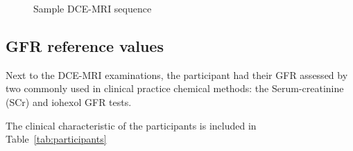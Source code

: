 \begin{figure}[H]
			\hspace{0.005\linewidth}
		\hspace{0.005\linewidth}
	\hspace{0.005\linewidth}
\vspace{0.5cm}
\caption[Sample DCE-MRI sequence.]{Sample DCE-MRI sequence}
\label{fig:set}
\end{figure}


\subsection{GFR reference values}
Next to the DCE-MRI examinations, the participant had their GFR assessed by two commonly used in clinical practice chemical methods: the Serum-creatinine (SCr) and iohexol GFR tests.  

The clinical characteristic of the participants is included in Table~\ref{tab:participants}



